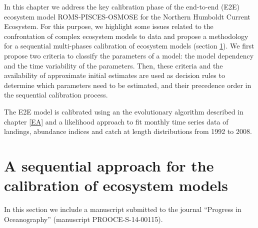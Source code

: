
In this chapter we address the key calibration phase of the end-to-end (E2E) ecosystem model ROMS-PISCES-OSMOSE for the Northern Humboldt Current Ecosystem. For this purpose, we highlight some issues related to the confrontation of complex ecosystem models to data and propose a methodology for a sequential multi-phases calibration of ecosystem models (section \ref{paper1}). We first propose two criteria to classify the parameters of a model: the model dependency and the time variability of the parameters. Then, these criteria and the availability of approximate initial estimates are used as decision rules to determine which parameters need to be estimated, and their precedence order in the sequential calibration process. 

The E2E model is calibrated using an the evolutionary algorithm described in chapter \ref{EA} and a likelihood approach to fit monthly time series data of landings, abundance indices and catch at length distributions from 1992 to 2008.  

\section{A sequential approach for the calibration of ecosystem models}
\label{paper1}

In this section we include a manuscript submitted to the journal ``Progress in Oceanography'' (manuscript PROOCE-S-14-00115).




